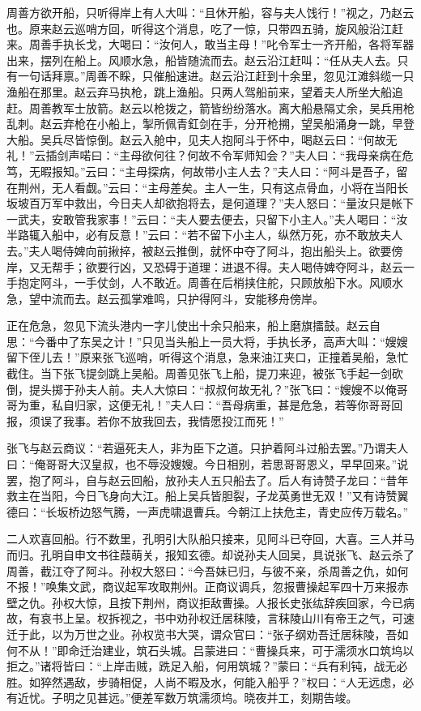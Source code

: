 周善方欲开船，只听得岸上有人大叫：“且休开船，容与夫人饯行！”视之，乃赵云也。原来赵云巡哨方回，听得这个消息，吃了一惊，只带四五骑，旋风般沿江赶来。周善手执长戈，大喝曰：“汝何人，敢当主母！”叱令军士一齐开船，各将军器出来，摆列在船上。风顺水急，船皆随流而去。赵云沿江赶叫：“任从夫人去。只有一句话拜禀。”周善不睬，只催船速进。赵云沿江赶到十余里，忽见江滩斜缆一只渔船在那里。赵云弃马执枪，跳上渔船。只两人驾船前来，望着夫人所坐大船追赶。周善教军士放箭。赵云以枪拨之，箭皆纷纷落水。离大船悬隔丈余，吴兵用枪乱刺。赵云弃枪在小船上，掣所佩青釭剑在手，分开枪搠，望吴船涌身一跳，早登大船。吴兵尽皆惊倒。赵云入舱中，见夫人抱阿斗于怀中，喝赵云曰：“何故无礼！”云插剑声喏曰：“主母欲何往？何故不令军师知会？”夫人曰：“我母亲病在危笃，无暇报知。”云曰：“主母探病，何故带小主人去？”夫人曰：“阿斗是吾子，留在荆州，无人看觑。”云曰：“主母差矣。主人一生，只有这点骨血，小将在当阳长坂坡百万军中救出，今日夫人却欲抱将去，是何道理？”夫人怒曰：“量汝只是帐下一武夫，安敢管我家事！”云曰：“夫人要去便去，只留下小主人。”夫人喝曰：“汝半路辄入船中，必有反意！”云曰：“若不留下小主人，纵然万死，亦不敢放夫人去。”夫人喝侍婢向前揪捽，被赵云推倒，就怀中夺了阿斗，抱出船头上。欲要傍岸，又无帮手；欲要行凶，又恐碍于道理：进退不得。夫人喝侍婢夺阿斗，赵云一手抱定阿斗，一手仗剑，人不敢近。周善在后梢挟住舵，只顾放船下水。风顺水急，望中流而去。赵云孤掌难鸣，只护得阿斗，安能移舟傍岸。

正在危急，忽见下流头港内一字儿使出十余只船来，船上磨旗擂鼓。赵云自思：“今番中了东吴之计！”只见当头船上一员大将，手执长矛，高声大叫：“嫂嫂留下侄儿去！”原来张飞巡哨，听得这个消息，急来油江夹口，正撞着吴船，急忙截住。当下张飞提剑跳上吴船。周善见张飞上船，提刀来迎，被张飞手起一剑砍倒，提头掷于孙夫人前。夫人大惊曰：“叔叔何故无礼？”张飞曰：“嫂嫂不以俺哥哥为重，私自归家，这便无礼！”夫人曰：“吾母病重，甚是危急，若等你哥哥回报，须误了我事。若你不放我回去，我情愿投江而死！”

张飞与赵云商议：“若逼死夫人，非为臣下之道。只护着阿斗过船去罢。”乃谓夫人曰：“俺哥哥大汉皇叔，也不辱没嫂嫂。今日相别，若思哥哥恩义，早早回来。”说罢，抱了阿斗，自与赵云回船，放孙夫人五只船去了。后人有诗赞子龙曰：“昔年救主在当阳，今日飞身向大江。船上吴兵皆胆裂，子龙英勇世无双！”又有诗赞翼德曰：“长坂桥边怒气腾，一声虎啸退曹兵。今朝江上扶危主，青史应传万载名。”

二人欢喜回船。行不数里，孔明引大队船只接来，见阿斗已夺回，大喜。三人并马而归。孔明自申文书往葭萌关，报知玄德。却说孙夫人回吴，具说张飞、赵云杀了周善，截江夺了阿斗。孙权大怒曰：“今吾妹已归，与彼不亲，杀周善之仇，如何不报！”唤集文武，商议起军攻取荆州。正商议调兵，忽报曹操起军四十万来报赤壁之仇。孙权大惊，且按下荆州，商议拒敌曹操。人报长史张纮辞疾回家，今已病故，有哀书上呈。权拆视之，书中劝孙权迁居秣陵，言秣陵山川有帝王之气，可速迁于此，以为万世之业。孙权览书大哭，谓众官曰：“张子纲劝吾迁居秣陵，吾如何不从！”即命迁治建业，筑石头城。吕蒙进曰：“曹操兵来，可于濡须水口筑坞以拒之。”诸将皆曰：“上岸击贼，跣足入船，何用筑城？”蒙曰：“兵有利钝，战无必胜。如猝然遇敌，步骑相促，人尚不暇及水，何能入船乎？”权曰：“人无远虑，必有近忧。子明之见甚远。”便差军数万筑濡须坞。晓夜并工，刻期告竣。

